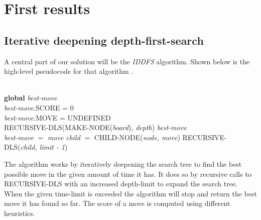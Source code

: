 \documentclass[a4paper,11pt]{article}
\begin{document}
\section{First results}


\subsection{Iterative deepening depth-first-search}
A central part of our solution will be the \emph{IDDFS} algorithm.
Shown below is the
high-level pseudocode for that algorithm \cite{aimodern}.\\
\begin{algorithmic}
 \\
\textbf{global} \emph{best-move} \\
\emph{best-move}.SCORE = 0 \\
\emph{best-move}.MOVE = UNDEFINED \\
\State RECURSIVE-DLS(MAKE-NODE(\emph{board}), \emph{depth})
\State \Return \emph{best-move}
\EndIf
\EndFor
\EndFunction
\\
\State \emph{best-move} $=$ \emph{move}
\EndIf
\State \emph{child} $=$ CHILD-NODE(\emph{node, move})
\State RECURSIVE-DLS(\emph{child, limit - 1})
\EndFor
\EndIf
\EndFunction
\end{algorithmic}

The algorithm works by iteratively deepening the search tree to find the best possible move in the given
amount of time it has. It does so by recursive calls to RECURSIVE-DLS with an increased depth-limit to expand
the search tree. When the given time-limit is exceeded the algorithm will stop and return the best move it has
found so far. The score of a move is computed using different heuristics.




\end{document}
